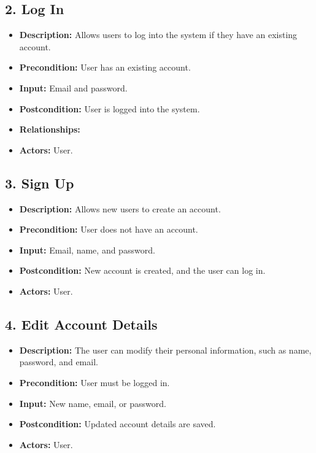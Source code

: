 \documentclass[a4paper,12pt]{article}
\begin{document}
\subsection*{2. Log In}
\begin{itemize}[left=0pt]
    \item \textbf{Description:} Allows users to log into the system if they have an existing account.
    \item \textbf{Precondition:} User has an existing account.
    \item \textbf{Input:} Email and password.
    \item \textbf{Postcondition:} User is logged into the system.
    \item \textbf{Relationships:}  
    \item \textbf{Actors:} User.
\end{itemize}

\subsection*{3. Sign Up}
\begin{itemize}[left=0pt]
    \item \textbf{Description:} Allows new users to create an account.
    \item \textbf{Precondition:} User does not have an account.
    \item \textbf{Input:} Email, name, and password.
    \item \textbf{Postcondition:} New account is created, and the user can log in.
    \item \textbf{Actors:} User.
\end{itemize}

\subsection*{4. Edit Account Details}
\begin{itemize}[left=0pt]
    \item \textbf{Description:} The user can modify their personal information, such as name, password, and email.
    \item \textbf{Precondition:} User must be logged in.
    \item \textbf{Input:} New name, email, or password.
    \item \textbf{Postcondition:} Updated account details are saved.
    \item \textbf{Actors:} User.
\end{itemize}
\end{document}
